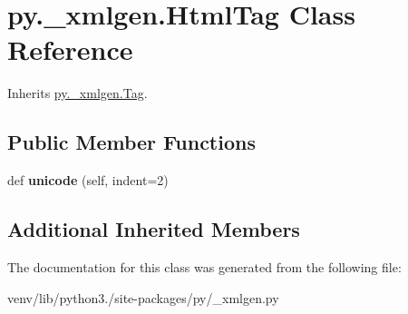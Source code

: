 \hypertarget{classpy_1_1__xmlgen_1_1_html_tag}{}\section{py.\+\_\+xmlgen.\+Html\+Tag Class Reference}
\label{classpy_1_1__xmlgen_1_1_html_tag}


Inherits \hyperlink{classpy_1_1__xmlgen_1_1_tag}{py.\+\_\+xmlgen.\+Tag}.

\subsection*{Public Member Functions}
\begin{DoxyCompactItemize}
\item 
\mbox{\label{classpy_1_1__xmlgen_1_1_html_tag_afcf4ca96b8e68dad6d96dab42d2a7102}} 
def {\bfseries unicode} (self, indent=2)
\end{DoxyCompactItemize}
\subsection*{Additional Inherited Members}


The documentation for this class was generated from the following file\+:\begin{DoxyCompactItemize}
\item 
venv/lib/python3./site-\/packages/py/\+\_\+xmlgen.\+py\end{DoxyCompactItemize}
